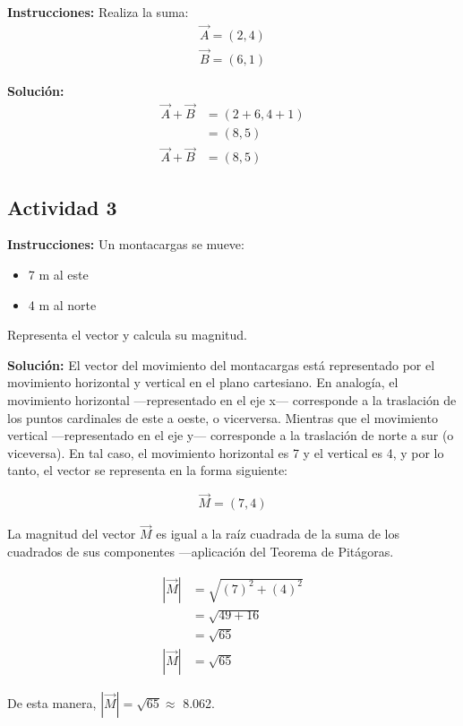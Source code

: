 \documentclass[12pt]{article}
\begin{document}
\textbf{Instrucciones:} Realiza la suma:
\begin{align*}
	\vec{A} = \left( 2, 4 \right) \\
	\vec{B} = \left( 6, 1 \right) 
\end{align*}

\textbf{Solución:}
\begin{align*}
	\vec{A} + \vec{B} &= \left( 2 + 6, 4 + 1 \right) \\
	&= \left( 8, 5 \right) \\
	\vec{A} + \vec{B} &= \left( 8, 5 \right)
\end{align*}
\newline


\subsection*{Actividad 3}

\textbf{Instrucciones:} Un montacargas se mueve:
\begin{itemize}
	\item 7 m al este
	\item 4 m al norte
\end{itemize}

Representa el vector y calcula su magnitud.
\newline

\textbf{Solución:}
El vector del movimiento del montacargas está representado por el movimiento horizontal y vertical en el plano cartesiano. En analogía, el movimiento horizontal ---representado en el eje x--- corresponde a la traslación de los puntos cardinales de este a oeste, o vicerversa. Mientras que el movimiento vertical ---representado en el eje y--- corresponde a la traslación de norte a sur (o viceversa). En tal caso, el movimiento horizontal es 7 y el vertical es 4, y por lo tanto, el vector se representa en la forma siguiente:

\[ \vec{M} = \left( 7, 4 \right) \]

La magnitud del vector $\vec{M}$ es igual a la raíz cuadrada de la suma de los cuadrados de sus componentes ---aplicación del Teorema de Pitágoras.

\begin{align*}
	|\vec{M}| &= \sqrt{ (7)^2 + (4)^2 } \\
	&= \sqrt{ 49 + 16 } \\
	&= \sqrt{65} \\
	|\vec{M}| &= \sqrt{65}
\end{align*}

De esta manera, $|\vec{M}| = \sqrt{65} \approx$ 8.062.
\end{document}
